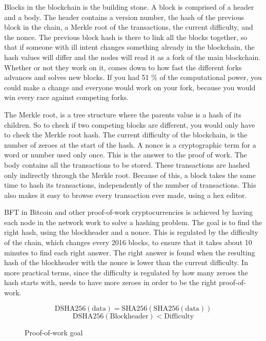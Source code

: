 \documentclass[11pt]{article}
\begin{document}
Blocks in the blockchain is the building stone. A block is comprised of a header and a body. The header contains a version number, the hash of the previous block in the chain, a Merkle root of the transactions, the current difficulty, and the nonce. The previous block hash is there to link all the blocks together, so that if someone with ill intent changes something already in the blockchain, the hash values will differ and the nodes will read it as a fork of the main blockchain. Whether or not they work on it, comes down to how fast the different forks advances and solves new blocks. If you had 51 \% of the computational power, you could make a change and everyone would work on your fork, because you would win every race against competing forks.

The Merkle root\cite{merkle}, is a tree structure where the parents value is a hash of its children. So to check if two competing blocks are different, you would only have to check the Merkle root hash. The current difficulty of the blockchain, is the number of zeroes at the start of the hash. A nonce is a cryptographic term for a word or number used only once. This is the answer to the proof of work. The body contains all the transactions to be stored. These transactions are hashed only indirectly through the Merkle root. Because of this, a block takes the same time to hash its transactions, independently of the number of transactions. This also makes it easy to browse every transaction ever made, using a hex editor.
 
BFT in Bitcoin and other proof-of-work cryptocurrencies is achieved by having each node in the network work to solve a hashing problem. The goal is to find the right hash, using the blockheader and a nonce. This is regulated by the difficulty of the chain, which changes every 2016 blocks, to ensure that it takes about 10 minutes to find each right answer. The right answer is found when the resulting hash of the blockheader with the nonce is lower than the current difficulty. In more practical terms, since the difficulty is regulated by how many zeroes the hash starts with, needs to have more zeroes in order to be the right proof-of-work.

\begin{figure}[h!]
\begin{equation*}
\textrm{DSHA256}(\textrm{data}) = \textrm{SHA256}(\textrm{SHA256}(\textrm{data}))
\end{equation*}
\begin{equation*}
\textrm{DSHA256}(\textrm{Blockheader}) < \textrm{Difficulty}
\end{equation*}
\caption{Proof-of-work goal}
\end{figure}
\end{document}
